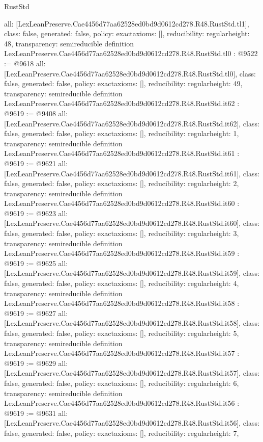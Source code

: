 \begin{lexlean}{RustStd}
\begin{coremodule}
{  all: [LexLeanPreserve.Cae4456d77aa62528ed0bd9d0612cd278.R48.RustStd.tl1],
  class: false,
  generated: false,
  policy: exact{axioms: []},
  reducibility: regular{height: 48},
  transparency: semireducible
}
definition LexLeanPreserve.Cae4456d77aa62528ed0bd9d0612cd278.R48.RustStd.tl0 : @9522 := @9618 {
  all: [LexLeanPreserve.Cae4456d77aa62528ed0bd9d0612cd278.R48.RustStd.tl0],
  class: false,
  generated: false,
  policy: exact{axioms: []},
  reducibility: regular{height: 49},
  transparency: semireducible
}
definition LexLeanPreserve.Cae4456d77aa62528ed0bd9d0612cd278.R48.RustStd.it62 : @9619 := @9408 {
  all: [LexLeanPreserve.Cae4456d77aa62528ed0bd9d0612cd278.R48.RustStd.it62],
  class: false,
  generated: false,
  policy: exact{axioms: []},
  reducibility: regular{height: 1},
  transparency: semireducible
}
definition LexLeanPreserve.Cae4456d77aa62528ed0bd9d0612cd278.R48.RustStd.it61 : @9619 := @9621 {
  all: [LexLeanPreserve.Cae4456d77aa62528ed0bd9d0612cd278.R48.RustStd.it61],
  class: false,
  generated: false,
  policy: exact{axioms: []},
  reducibility: regular{height: 2},
  transparency: semireducible
}
definition LexLeanPreserve.Cae4456d77aa62528ed0bd9d0612cd278.R48.RustStd.it60 : @9619 := @9623 {
  all: [LexLeanPreserve.Cae4456d77aa62528ed0bd9d0612cd278.R48.RustStd.it60],
  class: false,
  generated: false,
  policy: exact{axioms: []},
  reducibility: regular{height: 3},
  transparency: semireducible
}
definition LexLeanPreserve.Cae4456d77aa62528ed0bd9d0612cd278.R48.RustStd.it59 : @9619 := @9625 {
  all: [LexLeanPreserve.Cae4456d77aa62528ed0bd9d0612cd278.R48.RustStd.it59],
  class: false,
  generated: false,
  policy: exact{axioms: []},
  reducibility: regular{height: 4},
  transparency: semireducible
}
definition LexLeanPreserve.Cae4456d77aa62528ed0bd9d0612cd278.R48.RustStd.it58 : @9619 := @9627 {
  all: [LexLeanPreserve.Cae4456d77aa62528ed0bd9d0612cd278.R48.RustStd.it58],
  class: false,
  generated: false,
  policy: exact{axioms: []},
  reducibility: regular{height: 5},
  transparency: semireducible
}
definition LexLeanPreserve.Cae4456d77aa62528ed0bd9d0612cd278.R48.RustStd.it57 : @9619 := @9629 {
  all: [LexLeanPreserve.Cae4456d77aa62528ed0bd9d0612cd278.R48.RustStd.it57],
  class: false,
  generated: false,
  policy: exact{axioms: []},
  reducibility: regular{height: 6},
  transparency: semireducible
}
definition LexLeanPreserve.Cae4456d77aa62528ed0bd9d0612cd278.R48.RustStd.it56 : @9619 := @9631 {
  all: [LexLeanPreserve.Cae4456d77aa62528ed0bd9d0612cd278.R48.RustStd.it56],
  class: false,
  generated: false,
  policy: exact{axioms: []},
  reducibility: regular{height: 7},
}
\end{coremodule}
\end{lexlean}
